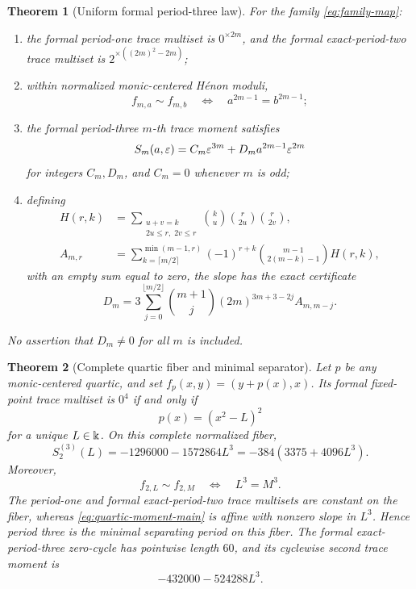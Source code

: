 \documentclass[11pt]{article}
\newtheorem{theorem}{Theorem}[section]
\theoremstyle{definition}
\theoremstyle{remark}
\begin{document}
\begin{theorem}[Uniform formal period-three law]
\label{thm:uniform}
For the family \eqref{eq:family-map}:
\begin{enumerate}[label=(\alph*),leftmargin=2.2em]
  \item the formal period-one trace multiset is \(0^{\times2m}\), and the
  formal exact-period-two trace multiset is
  \(2^{\times((2m)^2-2m)}\);
  \item within normalized monic-centered H\'enon moduli,
  \[
  f_{m,a}\sim f_{m,b}
  \quad\Longleftrightarrow\quad
  a^{2m-1}=b^{2m-1};
  \]
  \item the formal period-three \(m\)-th trace moment satisfies
  \begin{equation}
  S_m(a,\varepsilon)=C_m\varepsilon^{3m}+D_m a^{2m-1}\varepsilon^{2m}
  \label{eq:two-term-main}
  \end{equation}
  for integers \(C_m,D_m\), and \(C_m=0\) whenever \(m\) is odd;
  \item defining
  \begin{align}
  H(r,k)
  &=\sum_{\substack{u+v=k\\2u\le r,\;2v\le r}}
    \binom{k}{u}\binom{r}{2u}\binom{r}{2v},
  \label{eq:H-definition}\\
  A_{m,r}
  &=\sum_{k=\lceil m/2\rceil}^{\min(m-1,r)}
    (-1)^{r+k}\binom{m-1}{2(m-k)-1}H(r,k),
  \label{eq:A-definition}
  \end{align}
  with an empty sum equal to zero, the slope has the exact certificate
  \begin{equation}
  D_m=3\sum_{j=0}^{\lfloor m/2\rfloor}
  \binom{m+1}{j}(2m)^{3m+3-2j}A_{m,m-j}.
  \label{eq:D-certificate-main}
  \end{equation}
\end{enumerate}
No assertion that \(D_m\ne0\) for all \(m\) is included.
\end{theorem}

\begin{theorem}[Complete quartic fiber and minimal separator]
\label{thm:quartic}
Let \(p\) be any monic-centered quartic, and set
\(f_p(x,y)=(y+p(x),x)\).  Its formal fixed-point trace multiset is \(0^4\)
if and only if
\[
p(x)=(x^2-L)^2
\]
for a unique \(L\in\Bbbk\).  On this complete normalized fiber,
\begin{equation}
S_2^{(3)}(L)=-1296000-1572864L^3
=-384(3375+4096L^3).
\label{eq:quartic-moment-main}
\end{equation}
Moreover,
\[
f_{2,L}\sim f_{2,M}
\quad\Longleftrightarrow\quad
L^3=M^3.
\]
The period-one and formal exact-period-two trace multisets are constant on
the fiber, whereas \eqref{eq:quartic-moment-main} is affine with nonzero
slope in \(L^3\).  Hence period three is the minimal separating period on
this fiber.  The formal exact-period-three zero-cycle has pointwise length
\(60\), and its cyclewise second trace moment is
\[
-432000-524288L^3.
\]
\end{theorem}
\end{document}
